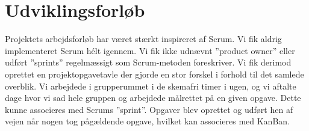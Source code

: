 \section{Udviklingsforløb}

Projektets arbejdsforløb har været stærkt inspireret af Scrum. Vi fik aldrig implementeret Scrum hélt igennem. Vi fik ikke udnævnt ”product owner” eller udført ”sprints” regelmæssigt som Scrum-metoden foreskriver. Vi fik derimod oprettet en projektopgavetavle der gjorde en stor forskel i forhold til det samlede overblik. Vi arbejdede i grupperummet i de skemafri timer i ugen, og vi aftalte dage hvor vi sad hele gruppen og arbejdede målrettet på en given opgave. Dette kunne associeres med Scrums ”sprint”. Opgaver blev oprettet og udført hen af vejen når nogen tog pågældende opgave, hvilket kan associeres med KanBan.